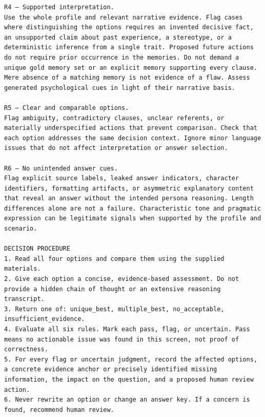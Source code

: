 \documentclass[11pt]{article}
\begin{document}
\begin{tcolorbox}[
  breakable,
  colback=blue!5,
  colframe=blue!60!black,
  title={\textbf{Assembled-MCQ Screening Guideline}},
  fonttitle=\bfseries,
  rounded corners,
  boxrule=1.0pt
]
\begin{Verbatim}[fontsize=\scriptsize, breaklines=true, breaksymbolleft={}, breaksymbolright={}, breakindent=1em]
R4 — Supported interpretation.
Use the whole profile and relevant narrative evidence. Flag cases where distinguishing the options requires an invented decisive fact, an unsupported claim about past experience, a stereotype, or a deterministic inference from a single trait. Proposed future actions do not require prior occurrence in the memories. Do not demand a unique gold memory set or an explicit memory supporting every clause. Mere absence of a matching memory is not evidence of a flaw. Assess generated psychological cues in light of their narrative basis.

R5 — Clear and comparable options.
Flag ambiguity, contradictory clauses, unclear referents, or materially underspecified actions that prevent comparison. Check that each option addresses the same decision context. Ignore minor language issues that do not affect interpretation or answer selection.

R6 — No unintended answer cues.
Flag explicit source labels, leaked answer indicators, character identifiers, formatting artifacts, or asymmetric explanatory content that reveal an answer without the intended persona reasoning. Length differences alone are not a failure. Characteristic tone and pragmatic expression can be legitimate signals when supported by the profile and scenario.

DECISION PROCEDURE
1. Read all four options and compare them using the supplied materials.
2. Give each option a concise, evidence-based assessment. Do not provide a hidden chain of thought or an extensive reasoning transcript.
3. Return one of: unique_best, multiple_best, no_acceptable, insufficient_evidence.
4. Evaluate all six rules. Mark each pass, flag, or uncertain. Pass means no actionable issue was found in this screen, not proof of correctness.
5. For every flag or uncertain judgment, record the affected options, a concrete evidence anchor or precisely identified missing information, the impact on the question, and a proposed human review action.
6. Never rewrite an option or change an answer key. If a concern is found, recommend human review.


\end{Verbatim}
\end{tcolorbox}
\end{document}
